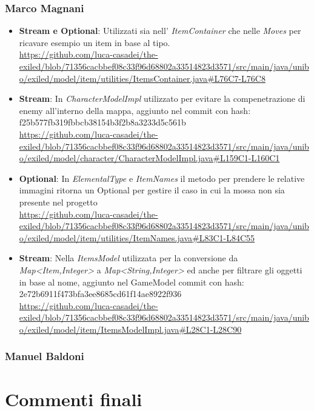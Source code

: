 \documentclass[a4paper,12pt]{report}
\begin{document}
\subsection*{Marco Magnani}
\begin{itemize}
	\item \textbf{Stream e Optional}: Utilizzati sia nell' \textit{ItemContainer} che nelle \textit{Moves} per ricavare esempio un item in base al tipo.\\ \url{https://github.com/luca-casadei/the-exiled/blob/71356cacbbef08c33f96d68802a33514823d3571/src/main/java/unibo/exiled/model/item/utilities/ItemsContainer.java#L76C7-L76C8}
	\item \textbf{Stream}: In \textit{CharacterModelImpl} utilizzato per evitare la compenetrazione di enemy all'interno della mappa, aggiunto nel commit con hash: f25b577fb319fbbcb38154b3f2b8a3233d5c561b\\
	\url{https://github.com/luca-casadei/the-exiled/blob/71356cacbbef08c33f96d68802a33514823d3571/src/main/java/unibo/exiled/model/character/CharacterModelImpl.java#L159C1-L160C1} 
	\item \textbf{Optional}: In \textit{ElementalType} e \textit{ItemNames} il metodo per prendere le relative immagini ritorna un Optional per gestire il caso in cui la mossa non sia presente nel progetto\\
	\url{https://github.com/luca-casadei/the-exiled/blob/71356cacbbef08c33f96d68802a33514823d3571/src/main/java/unibo/exiled/model/item/utilities/ItemNames.java#L83C1-L84C55}
	\item \textbf{Stream}: Nella \textit{ItemsModel} utilizzata per la conversione da \textit{Map\textless Item,Integer\textgreater} a \textit{Map\textless String,Integer\textgreater} ed anche per filtrare gli oggetti in base al nome, aggiunto nel GameModel commit con hash: 2e72b6911f473bfa3ee8685cd61f14ae8922f936\\
	\url{https://github.com/luca-casadei/the-exiled/blob/71356cacbbef08c33f96d68802a33514823d3571/src/main/java/unibo/exiled/model/item/ItemsModelImpl.java#L28C1-L28C90}
\end{itemize}


\subsection*{Manuel Baldoni}

\chapter{Commenti finali}
\end{document}
